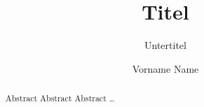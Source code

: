 \documentclass[margin=small]{../hsrbericht}
\title{Titel}
\subtitle{Untertitel}
\author{Vorname Name}
\begin{document}
\maketitle
\begin{abstract}
Abstract Abstract Abstract \dots
\end{abstract}

\pagestyle{hsrbericht}

\Blinddocument
\end{document}
